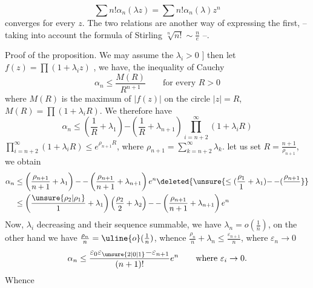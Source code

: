 \[ \sum n!\alpha_n(\lambda z)=\sum n!\alpha_n(\lambda)z^n \]
converges
for every $z$. The two  relations
 are another way of expressing the first,
-- taking into account the formula of
Stirling $\sqrt[n]{n!}\sim\frac{n}{e}$ --.

Proof of the proposition. We may
assume the $\lambda_i>0$  $]$ then let $f(z)=\prod(1+\lambda_i z)$
,   we have,  the inequality
of Cauchy
\[ \alpha_n\leq\frac{M(R)}{R^{n+1}}\qquad\text{for every }R>0 \]
where $M(R)$ is the maximum of $|f(z)|$ on the
circle $|z|=R$,  $M(R)=\prod(1+\lambda_iR)$.
 We therefore have
\[ \alpha_n\leq\left(\frac1R+\lambda_1\right)\mathord{-}\left(\frac1R+\lambda_{n+1}\right)\prod_{i=n+2}^{\infty}(1+\lambda_i R) \]
  $\prod_{i=n+2}^{\infty}(1+\lambda_i R)\leq e^{\rho_{n+1}R}$, where
$\rho_{n+1}=\sum_{k=n+2}^{\infty}\lambda_k$. let us set $R=\frac{n+1}{\rho_{n+1}}$, we obtain
\[ \begin{aligned}
\alpha_n&\leq\left(\frac{\rho_{n+1}}{n+1}+\lambda_1\right)\mathord{-}\,\mathord{-}\left(\frac{\rho_{n+1}}{n+1}+\lambda_{n+1}\right)e^n \deleted{\unsure{\leq(\frac{\rho_1}{1}+\lambda_1)\mathord{-}\,\mathord{-}(\frac{\rho_{n+1}}{}}}\\
&\leq\left(\frac{\unsure{\rho_2|\rho_1}}{1}+\lambda_1\right)\left(\frac{\rho_2}{2}+\lambda_2\right)\mathord{-}\,\mathord{-}\left(\frac{\rho_{n+1}}{n+1}+\lambda_{n+1}\right)e^n
\end{aligned} \]
Now,   $\lambda_i$   decreasing and their
sequence summable, we have $\lambda_n=o(\frac1n)$, on the other hand we
have  $\frac{\rho_n}{n}=\uline{o}(\frac{1}{n})$, whence $\frac{\rho_n}{n}+\lambda_n\leq\frac{\varepsilon_{n+1}}{n}$, where $\varepsilon_n\to0$
\[ \alpha_n\leq\frac{\varepsilon_0\varepsilon_{\unsure{2|0|1}}\mathord{-}\varepsilon_{n+1}}{(n+1)!}e^n\qquad\text{where }\varepsilon_i\to0. \]
Whence

